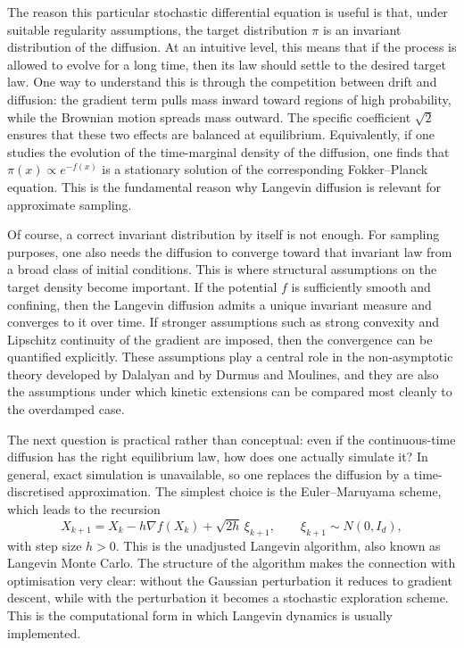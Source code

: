 \documentclass[a4paper,11pt, titlepage]{article}
\theoremstyle{definition}
\theoremstyle{plain}
\theoremstyle{remark}
\begin{document}
The reason this particular stochastic differential equation is useful is that, under suitable regularity assumptions, the target distribution $\pi$ is an invariant distribution of the diffusion. At an intuitive level, this means that if the process is allowed to evolve for a long time, then its law should settle to the desired target law. One way to understand this is through the competition between drift and diffusion: the gradient term pulls mass inward toward regions of high probability, while the Brownian motion spreads mass outward. The specific coefficient $\sqrt{2}$ ensures that these two effects are balanced at equilibrium. Equivalently, if one studies the evolution of the time-marginal density of the diffusion, one finds that $\pi(x)\propto e^{-f(x)}$ is a stationary solution of the corresponding Fokker--Planck equation. This is the fundamental reason why Langevin diffusion is relevant for approximate sampling.

Of course, a correct invariant distribution by itself is not enough. For sampling purposes, one also needs the diffusion to converge toward that invariant law from a broad class of initial conditions. This is where structural assumptions on the target density become important. If the potential $f$ is sufficiently smooth and confining, then the Langevin diffusion admits a unique invariant measure and converges to it over time. If stronger assumptions such as strong convexity and Lipschitz continuity of the gradient are imposed, then the convergence can be quantified explicitly. These assumptions play a central role in the non-asymptotic theory developed by Dalalyan and by Durmus and Moulines, and they are also the assumptions under which kinetic extensions can be compared most cleanly to the overdamped case.

The next question is practical rather than conceptual: even if the continuous-time diffusion has the right equilibrium law, how does one actually simulate it? In general, exact simulation is unavailable, so one replaces the diffusion by a time-discretised approximation. The simplest choice is the Euler--Maruyama scheme, which leads to the recursion
\[
X_{k+1} = X_k - h\nabla f(X_k) + \sqrt{2h}\,\xi_{k+1},
\qquad
\xi_{k+1}\sim N(0,I_d),
\]
with step size $h>0$. This is the unadjusted Langevin algorithm, also known as Langevin Monte Carlo. The structure of the algorithm makes the connection with optimisation very clear: without the Gaussian perturbation it reduces to gradient descent, while with the perturbation it becomes a stochastic exploration scheme. This is the computational form in which Langevin dynamics is usually implemented.
\end{document}
